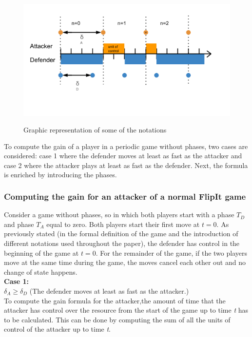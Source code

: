 \begin{figure}[hbtp]
\caption{Graphic representation of some of the notations}
\centering
\includegraphics[scale=0.8]{Images/notqties}
\label{fig:notations}
\end{figure}

To compute the gain of a player in a periodic game without phases, two cases are considered: case 1 where the defender moves at least as fast as the attacker and case 2 where the attacker plays at least as fast as the defender.  Next, the formula is enriched by introducing the phases.

\subsubsection{Computing the gain for an attacker of a normal FlipIt game}
Consider a game without phases, so in which both players start with a phase $T_{D}$ and phase $T_{A}$ equal to zero. Both players start their first move at $t=0$. As previously stated (in the formal definition of the game and the introduction of different notations used throughout the paper), the defender has control in the beginning of the game at $t=0$. For the remainder of the game, if the two players move at the same time during the game, the moves cancel each other out and no change of state happens. \\

\textbf{Case  1:} \\
$\delta_{A} \geq \delta_{D}$ (The defender moves at least as fast as the attacker.) \\



To compute the gain formula for the attacker,the amount of time that the attacker has control over the resource from the start of the game up to time \textit{t} has to be calculated. This can be done by computing the sum of all the units of control of the attacker up to time \textit{t}. 


